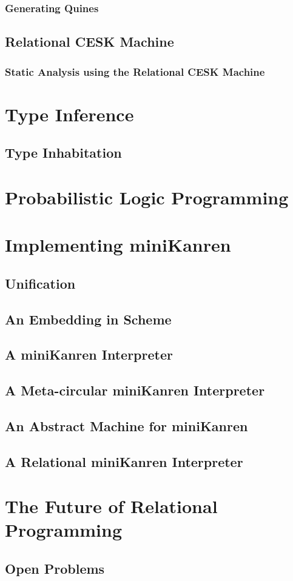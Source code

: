 \documentclass[onecolumn, 11pt, oneside, openright]{book}
\begin{document}
\begin{schemeregion}
\subsection{Generating Quines}
\section{Relational CESK Machine}
\subsection{Static Analysis using the Relational CESK Machine}

\chapter{Type Inference}
\section{Type Inhabitation}

\chapter{Probabilistic Logic Programming}

\chapter{Implementing miniKanren}
\section{Unification}
\section{An Embedding in Scheme}
\section{A miniKanren Interpreter}
\section{A Meta-circular miniKanren Interpreter}
\section{An Abstract Machine for miniKanren}
\section{A Relational miniKanren Interpreter}

\chapter{The Future of Relational Programming}
\section{Open Problems}



\appendix

\end{schemeregion}
\end{document}
